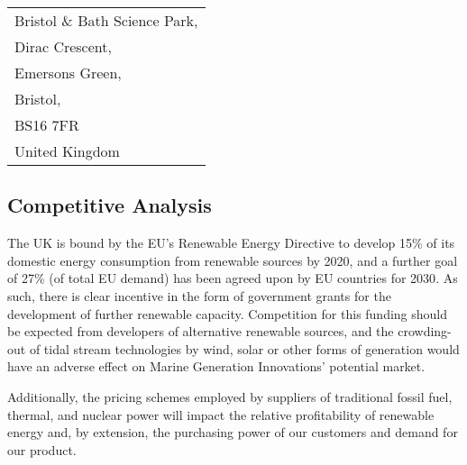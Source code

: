 \documentclass[a4paper,11pt]{article}
\begin{document}
\begin{tabular}{l}
Bristol \& Bath Science Park,\\
Dirac Crescent,\\
Emersons Green,\\
Bristol,\\
BS16 7FR\\
United Kingdom\\
\end{tabular}

\subsection{Competitive Analysis}
The UK is bound by the EU's Renewable Energy Directive to develop 15\% of its domestic energy consumption from renewable sources by 2020\cite{r4}, and a further goal of 27\% (of total EU demand) has been agreed upon by EU countries for 2030\cite{r5}. As such, there is clear incentive in the form of government grants for the development of further renewable capacity. Competition for this funding should be expected from developers of alternative renewable sources, and the crowding-out of tidal stream technologies by wind, solar or other forms of generation would have an adverse effect on Marine Generation Innovations' potential market.

Additionally, the pricing schemes employed by suppliers of traditional fossil fuel, thermal, and nuclear power will impact the relative profitability of renewable energy and, by extension, the purchasing power of our customers and demand for our product.
\end{document}
